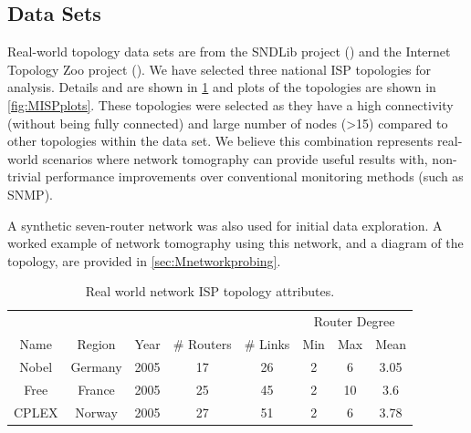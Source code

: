 \subsection{Data Sets}
\label{ssec:Mdatasets}
Real-world topology data sets are from the SNDLib project (\cite{orlowski_sndlib_2007}) and the Internet Topology Zoo project (\cite{knight_internet_2011}). We have selected three national ISP topologies for analysis. Details and are shown in \cref{tbl:Mrealnetworkattributes} and plots of the topologies are shown in \cref{fig:MISPplots}. These topologies were selected as they have a high connectivity (without being fully connected) and large number of nodes (>15) compared to other topologies within the data set. We believe this combination represents real-world scenarios where network tomography can provide useful results with, non-trivial performance improvements over conventional monitoring methods (such as SNMP).\par
A synthetic seven-router network was also used for initial data exploration. A worked example of network tomography using this network, and a diagram of the topology, are provided in \cref{sec:Mnetworkprobing}.\par
\begin{table}[H]
    \centering
    \begin{tabular}{@{}cccccccc@{}} 
      \toprule
      &&&&&\multicolumn{3}{c}{Router Degree}\\
      \cmidrule{6-8}
      Name & Region & Year & \# Routers & \# Links & Min & Max & Mean \\
      \midrule
      Nobel & Germany & 2005 & 17 & 26 & 2 & 6 & 3.05\\
      Free & France & 2005 & 25 & 45 & 2 & 10 & 3.6\\
      CPLEX & Norway & 2005 & 27 & 51 & 2 & 6 & 3.78\\
      \bottomrule
    \end{tabular}
    \caption{Real world network ISP topology attributes.}
    \label{tbl:Mrealnetworkattributes}
\end{table}
\noindent
